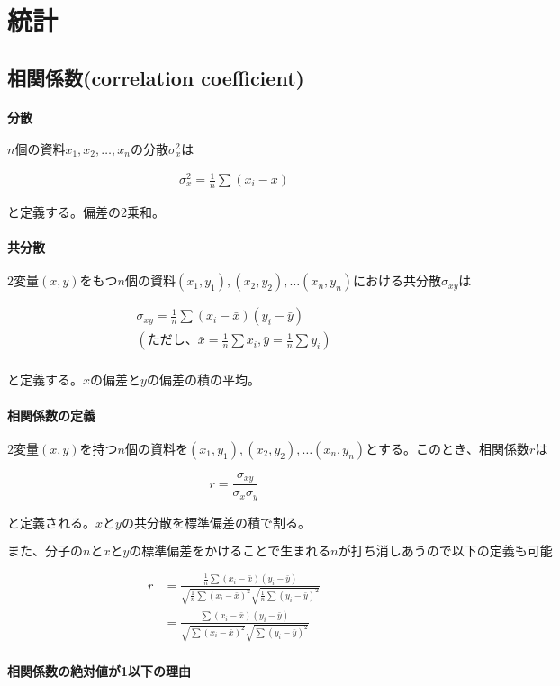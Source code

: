 \documentclass{jlreq}
\begin{document}
\fi
\section{統計}

\subsection{相関係数(correlation coefficient)}

\paragraph{分散}
$n個の資料x_1, x_2, \dots, x_nの分散\sigma_{x}^{2}は$

\begin{gather*}
    \sigma_{x}^2 = \frac{1}{n} \sum (x_i - \bar{x})
\end{gather*}

と定義する。偏差の2乗和。

\paragraph{共分散}

$2変量(x,y)をもつn個の資料(x_1, y_1), (x_2, y_2), \dots (x_n, y_n)における共分散 \sigma_{xy}は$

\begin{gather*}
    \sigma_{xy} = \frac{1}{n} \sum (x_i - \bar{x}) (y_i - \bar{y})\\
    (ただし、\bar{x} = \frac{1}{n} \sum x_i, \bar{y} = \frac{1}{n} \sum y_i)\\
\end{gather*}

と定義する。$xの偏差とyの偏差の積の平均。$

\paragraph{相関係数の定義}

$2変量(x,y)を持つn個の資料を(x_1,y_1), (x_2, y_2), \dots (x_n, y_n)とする。このとき、相関係数rは$

\[r = \frac{\sigma_{xy}}{\sigma_x \sigma_y}\]

と定義される。$xとyの共分散を標準偏差の積で割る。$

$また、分子のnとxとyの標準偏差をかけることで生まれるnが打ち消しあうので以下の定義も可能$

\begin{align*}
    r &= \frac
        {\frac{1}{n} \sum (x_i - \bar{x})(y_i - \bar{y}) }
        { \sqrt{\frac{1}{n} \sum (x_i - \bar{x})^2}  \sqrt{\frac{1}{n} \sum (y_i - \bar{y})^2}} \\
      &= \frac
        {\sum (x_i - \bar{x})(y_i - \bar{y})}
        { \sqrt{\sum (x_i - \bar{x})^2} \sqrt{\sum (y_i - \bar{y})^2}}
\end{align*}

\paragraph{相関係数の絶対値が1以下の理由}
\end{document}
